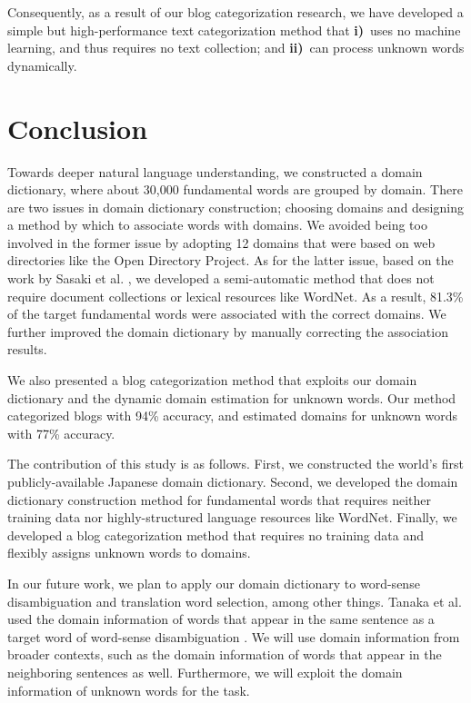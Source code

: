 \documentclass[english]{jnlp_1.4_rep}
\begin{document}
Consequently, as a result of our blog categorization research, 
we have developed a simple but high-performance text categorization
method that
\textbf{i)}~uses no machine learning, and thus requires no text
collection;
and \textbf{ii)}~can process unknown words dynamically.


\section{Conclusion}
\label{sec:conclusion}

Towards deeper natural language understanding, 
we constructed a domain dictionary, where about 30,000 fundamental words
are grouped by domain.
There are two issues in domain dictionary construction;
choosing domains and designing a method by which to associate words with
domains. 
We avoided being too involved in the former issue by adopting 12 domains
that were based on web directories like the Open Directory Project.
As for the latter issue, based on the work by Sasaki et al.
,
we developed a semi-automatic
method that does not require document collections or lexical resources
like WordNet.
As a result, 81.3\% of the target fundamental words were associated with
the correct domains. 
We further improved the domain dictionary by manually correcting the
association results.

We also presented a blog categorization method
that exploits our domain dictionary
and the dynamic
domain estimation for unknown words.
Our method categorized blogs with 94\% accuracy, and estimated domains
for unknown words with 77\% accuracy.

The contribution of this study is as follows.
First, we constructed the world's first publicly-available Japanese
domain dictionary.
Second, we developed the domain dictionary construction method for
fundamental words that requires neither training data nor
highly-structured language resources like WordNet.
Finally, we developed a blog categorization method that requires
no training data and flexibly assigns unknown words to domains.

In our future work, we plan to apply
our domain dictionary to word-sense
disambiguation and translation word selection, among other things.
Tanaka et al. used the domain information of words that appear in the
same sentence as a target word of word-sense disambiguation
\cite{Tanaka:Bond:Baldwin:Fujita:Hashimoto:2007}.
We will use domain information from broader contexts,
such as the domain information of words that appear in the neighboring
sentences as well.
Furthermore, we will exploit the domain information of unknown words for the
task. 
\end{document}
